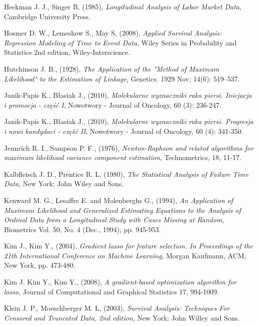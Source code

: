 \begin{thebibliography}{99}
 Heckman J. J., Singer B, (1985), \textit{Longitudinal Analysis of Labor Market Data}, Cambridge University Press.

 Hosmer D. W., Lemeshow S., May S, (2008), \textit{Applied Survival Analysis: Regression Modeling of Time to Event Data}, Wiley Series in Probability and Statistics 2nd edition, Wiley-Interscience.


 Hutchinson J. B., (1928), \textit{The Application of the "Method of Maximum Likelihood" to the Estimation of Linkage}, Genetics. 1929 Nov; 14(6): 519–537.


 Janik-Papis K., Błasiak J., (2010), \textit{Molekularne wyznaczniki raka piersi. Inicjacja i promocja - część I}, Nowotwory - Journal of Oncology, 60 (3): 236-247.

 Janik-Papis K., Błasiak J., (2010), \textit{Molekularne wyznaczniki raka piersi. Progresja i nowi kandydaci - część II}, Nowotwory - Journal of Oncology, 60 (4): 341-350.

 Jennrich R. I., Sampson P. F., (1976), \textit{Newton-Raphson and related algorithms for maximum likelihood variance component estimation}, Technometrics, 18, 11-17.


 Kalbfleisch J. D., Prentice R. L, (1980), \textit{The Statistical Analysis of Failure Time Data}, New York: John Wiley and Sons. 

 Kenward M. G., Lesaffre E. and Molenberghs G., (1994), \textit{An Application of Maximum Likelihood and Generalized Estimating Equations to the Analysis of Ordinal Data from a Longitudinal Study with Cases Missing at Random}, Biometrics Vol. 50, No. 4 (Dec., 1994), pp. 945-953.

 Kim J., Kim Y., (2004), \textit{Gradient lasso for feature selection. In Proceedings of the
21th International Conference on Machine Learning}, Morgan Kaufmann, ACM, New York, pp. 473-480.

 Kim J. Kim Y., Kim Y., (2008), \textit{A gradient-based optimization algorithm for lasso},  Journal of Computational and Graphical Statistics 17, 994-1009.

 Klein J. P., Moeschberger M. L, (2003), \textit{Survival Analysis: Techniques For Censored and Truncated Data, 2nd edition}, New York: John Willey and Sons.




\end{thebibliography}
